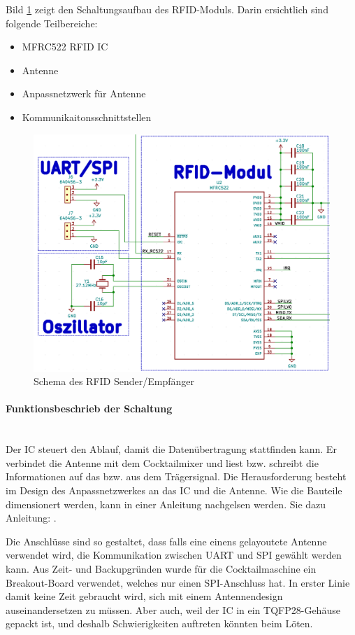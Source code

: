 Bild \ref{fig:Schema_RFID} zeigt den Schaltungsaufbau des RFID-Moduls. Darin ersichtlich sind folgende Teilbereiche:

\begin{itemize}
\item MFRC522 RFID IC
\item Antenne
\item Anpassnetzwerk für Antenne
\item Kommunikaitonsschnittstellen
\end{itemize}

\begin{figure}[!h]
\center
\includegraphics[width = 0.6 \textwidth]{graphics/Schema_RFID}
\caption{Schema des RFID Sender/Empfänger}
\label{fig:Schema_RFID}
\end{figure}

\paragraph{Funktionsbeschrieb der Schaltung}\mbox{}\\

Der IC steuert den Ablauf, damit die Datenübertragung stattfinden kann. Er verbindet die Antenne mit dem Cocktailmixer und liest bzw. schreibt die Informationen auf das bzw. aus dem Trägersignal. Die Herausforderung besteht im Design des Anpassnetzwerkes an das IC und die Antenne. Wie die Bauteile dimensionert werden, kann in einer Anleitung nachgelsen werden. Sie dazu Anleitung: \cite{nxp_bv_2010_antenna_2010}.

Die Anschlüsse sind so gestaltet, dass falls eine einens gelayoutete Antenne verwendet wird, die Kommunikation zwischen UART und SPI gewählt werden kann. Aus Zeit- und Backupgründen wurde für die Cocktailmaschine ein Breakout-Board verwendet, welches nur einen SPI-Anschluss hat. In erster Linie damit keine Zeit gebraucht wird, sich mit einem Antennendesign auseinandersetzen zu müssen. Aber auch, weil der IC in ein TQFP28-Gehäuse gepackt ist, und deshalb Schwierigkeiten auftreten könnten beim Löten.